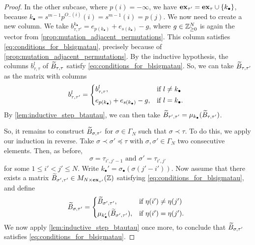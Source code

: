 \begin{proof}
	In the other subcase, where $p(i) = -\infty$, we have $\mathbf{ex}_{\tau'} = \mathbf{ex}_\tau \cup
		\{k_\bullet\}$, because $k_\bullet = s^{m-1}p^{O_{-}(i)}(i) = s^{m-1}(i) = p(j)$. We
	now need to create a new column. We take $b^{k_\bullet}_{\tau, \tau'} =
		e_{p(k_\bullet)} + e_{s(k_\bullet)} - g$, where $g \in \mathbb{Z}_{\geq 0}^N$ is again the
	vector from \cref{prop:mutation_adjacent_permutations}. This column satisfies
	\cref{eq:conditions_for_blsigmatau}, precisely because of
	\cref{prop:mutation_adjacent_permutations}. By the inductive hypothesis, the columns
	$b^l_{\tau, \tau}$ of $\widetilde{B}_{\tau, \tau}$ satisfy \cref{eq:conditions_for_blsigmatau}.
	So, we can take $\widetilde{B}_{\tau, \tau'}$ as the matrix with columns
	\begin{equation*}
		b^l_{\tau, \tau'} = \begin{dcases*}
			b^l_{\tau, \tau},                        & if $l \neq k_\bullet$ \\
			e_{p(k_\bullet)} + e_{s(k_\bullet)} - g, & if $l = k_\bullet$.
		\end{dcases*}
	\end{equation*}
	By \cref{lem:inductive_step_btautau}, we can then take $\widetilde{B}_{\tau', \tau'} =
		\mu_{k_\bullet}(\widetilde{B}_{\tau, \tau'})$.

	So, it remains to construct $\widetilde{B}_{\sigma, \tau'}$ for $\sigma \in \Gamma_N$ such that
	$\sigma \prec \tau$. To do this, we apply our induction in reverse. Take $\sigma \prec
		\sigma' \preceq \tau$ with $\sigma, \sigma' \in \Gamma_N$ two consecutive elements.
	Then, as before,
	\begin{equation*}
		\sigma = \tau_{i',j' -1} \text{ and } \sigma' = \tau_{i', j'}
	\end{equation*}
	for some $1 \leq i'< j' \leq N$. Write $k_\bullet' = \sigma_\bullet(\sigma(j' - i'))$. Now assume that there exists a matrix $\widetilde{B}_{\sigma', \tau'} \in M_{N \times \mathbf{ex}_{\tau'}}(\mathbb{Z})$ satisfying \cref{eq:conditions_for_blsigmatau}, and define
	\begin{equation*}
		\tB_{\sigma, \tau'} = \begin{dcases*}
			\tB_{\sigma', \tau'},                   & if $\eta(i') \neq \eta(j')$ \\
			\mu_{k_\bullet'}(\tB_{\sigma', \tau'}), & if $\eta(i') = \eta(j')$.
		\end{dcases*}
	\end{equation*}
	We now apply \cref{lem:inductive_step_btautau} once more, to conclude that
	$\widetilde{B}_{\sigma, \tau'}$ satisfies \cref{eq:conditions_for_blsigmatau}.

\end{proof}

